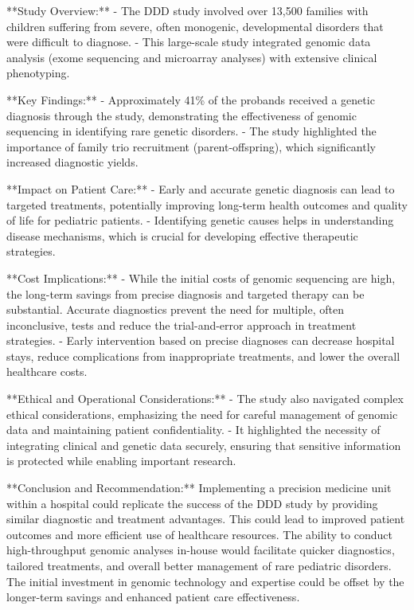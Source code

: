 **Study Overview:**
- The DDD study involved over 13,500 families with children suffering from severe, often monogenic, developmental disorders that were difficult to diagnose.
- This large-scale study integrated genomic data analysis (exome sequencing and microarray analyses) with extensive clinical phenotyping.

**Key Findings:**
- Approximately 41\% of the probands received a genetic diagnosis through the study, demonstrating the effectiveness of genomic sequencing in identifying rare genetic disorders.
- The study highlighted the importance of family trio recruitment (parent-offspring), which significantly increased diagnostic yields.

**Impact on Patient Care:**
- Early and accurate genetic diagnosis can lead to targeted treatments, potentially improving long-term health outcomes and quality of life for pediatric patients.
- Identifying genetic causes helps in understanding disease mechanisms, which is crucial for developing effective therapeutic strategies.

**Cost Implications:**
- While the initial costs of genomic sequencing are high, the long-term savings from precise diagnosis and targeted therapy can be substantial. Accurate diagnostics prevent the need for multiple, often inconclusive, tests and reduce the trial-and-error approach in treatment strategies.
- Early intervention based on precise diagnoses can decrease hospital stays, reduce complications from inappropriate treatments, and lower the overall healthcare costs.

**Ethical and Operational Considerations:**
- The study also navigated complex ethical considerations, emphasizing the need for careful management of genomic data and maintaining patient confidentiality.
- It highlighted the necessity of integrating clinical and genetic data securely, ensuring that sensitive information is protected while enabling important research.

**Conclusion and Recommendation:**
Implementing a precision medicine unit within a hospital could replicate the success of the DDD study by providing similar diagnostic and treatment advantages. This could lead to improved patient outcomes and more efficient use of healthcare resources. The ability to conduct high-throughput genomic analyses in-house would facilitate quicker diagnostics, tailored treatments, and overall better management of rare pediatric disorders. The initial investment in genomic technology and expertise could be offset by the longer-term savings and enhanced patient care effectiveness.

